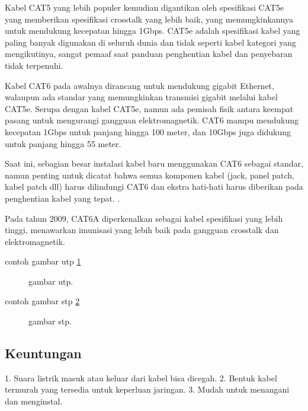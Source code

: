 Kabel CAT5 yang lebih populer kemudian digantikan oleh spesifikasi CAT5e yang memberikan spesifikasi crosstalk yang lebih baik, yang memungkinkannya untuk 
mendukung kecepatan hingga 1Gbps. CAT5e adalah spesifikasi kabel yang paling banyak digunakan di seluruh dunia dan tidak seperti kabel kategori yang 
mengikutinya, sangat pemaaf saat panduan penghentian kabel dan penyebaran tidak terpenuhi.

Kabel CAT6 pada awalnya dirancang untuk mendukung gigabit Ethernet, walaupun ada standar yang memungkinkan transmisi gigabit melalui kabel CAT5e. Serupa 
dengan kabel CAT5e, namun ada pemisah fisik antara keempat pasang untuk mengurangi gangguan elektromagnetik. CAT6 mampu mendukung kecepatan 1Gbps untuk 
panjang hingga 100 meter, dan 10Gbps juga didukung untuk panjang hingga 55 meter.

Saat ini, sebagian besar instalasi kabel baru menggunakan CAT6 sebagai standar, namun penting untuk dicatat bahwa semua komponen kabel (jack, panel patch, 
kabel patch dll) harus dilindungi CAT6 dan ekstra hati-hati harus diberikan pada penghentian kabel yang tepat. .

Pada tahun 2009, CAT6A diperkenalkan sebagai kabel spesifikasi yang lebih tinggi, menawarkan imunisasi yang lebih baik pada gangguan crosstalk dan elektromagnetik.

	contoh gambar utp \ref{utp}
	\begin{figure}[ht]
		\centerline{}
		\caption{gambar utp.}
		\label{utp}
	\end{figure}
	
	contoh gambar stp \ref{stp}
	\begin{figure}[ht]
		\centerline{}
		\caption{gambar stp.}
		\label{stp}
	\end{figure}
	
\subsection{Keuntungan}
1. Suara listrik masuk atau keluar dari kabel bisa dicegah.
2. Bentuk kabel termurah yang tersedia untuk keperluan jaringan.
3. Mudah untuk menangani dan menginstal.


